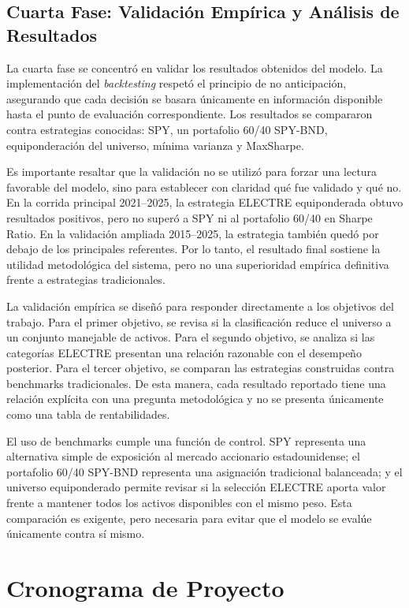 \documentclass[12pt,letterpaper]{article}
\begin{document}
\subsection{Cuarta Fase: Validación Empírica y Análisis de Resultados}

La cuarta fase se concentró en validar los resultados obtenidos del modelo. La implementación del \textit{backtesting} respetó el principio de no anticipación, asegurando que cada decisión se basara únicamente en información disponible hasta el punto de evaluación correspondiente. Los resultados se compararon contra estrategias conocidas: SPY, un portafolio 60/40 SPY-BND, equiponderación del universo, mínima varianza y MaxSharpe.

Es importante resaltar que la validación no se utilizó para forzar una lectura favorable del modelo, sino para establecer con claridad qué fue validado y qué no. En la corrida principal 2021--2025, la estrategia ELECTRE equiponderada obtuvo resultados positivos, pero no superó a SPY ni al portafolio 60/40 en Sharpe Ratio. En la validación ampliada 2015--2025, la estrategia también quedó por debajo de los principales referentes. Por lo tanto, el resultado final sostiene la utilidad metodológica del sistema, pero no una superioridad empírica definitiva frente a estrategias tradicionales.

La validación empírica se diseñó para responder directamente a los objetivos del trabajo. Para el primer objetivo, se revisa si la clasificación reduce el universo a un conjunto manejable de activos. Para el segundo objetivo, se analiza si las categorías ELECTRE presentan una relación razonable con el desempeño posterior. Para el tercer objetivo, se comparan las estrategias construidas contra benchmarks tradicionales. De esta manera, cada resultado reportado tiene una relación explícita con una pregunta metodológica y no se presenta únicamente como una tabla de rentabilidades.

El uso de benchmarks cumple una función de control. SPY representa una alternativa simple de exposición al mercado accionario estadounidense; el portafolio 60/40 SPY-BND representa una asignación tradicional balanceada; y el universo equiponderado permite revisar si la selección ELECTRE aporta valor frente a mantener todos los activos disponibles con el mismo peso. Esta comparación es exigente, pero necesaria para evitar que el modelo se evalúe únicamente contra sí mismo.


\section{Cronograma de Proyecto}
\end{document}
